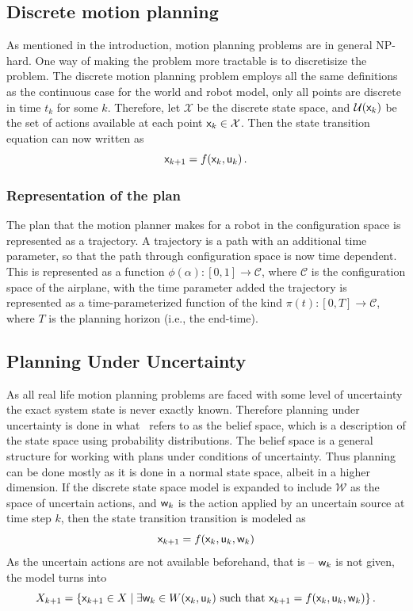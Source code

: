 \subsection{Discrete motion planning}

As mentioned in the introduction, motion planning problems are in general
NP-hard. One way of making the problem more tractable is to discretisize the
problem. The discrete motion planning problem employs all the same definitions
as the continuous case for the world and robot model, only all points are
discrete in time \(t_k\) for some \(k\). Therefore, let \(\mathcal{X}\) be the
discrete state space, and \(\mathcal{U}({\mathbf{\mathsf{x}}}_k)\) be the set of actions
available at each point \({\mathbf{\mathsf{x}}}_k \in \mathcal{X}\). Then the state
transition equation can now written as
\[
  {\mathbf{\mathsf{x}}}_{k+1} = f({\mathbf{\mathsf{x}}}_k, {\mathbf{\mathsf{u}}}_k) \, .
\]

\subsubsection{Representation of the plan}

The plan that the motion planner makes for a robot in the configuration space is
represented as a trajectory. A trajectory is a path with an additional time
parameter, so that the path through configuration space is now time dependent.
This is represented as a function \(\phi(\alpha) \colon [0,1] \rightarrow
\mathcal{C}\), where \(\mathcal{C}\) is the configuration space of the airplane,
with the time parameter added the trajectory is represented as a
time-parameterized function of the kind \(\pi(t) \colon [0,T] \rightarrow
\mathcal{C}\), where \(T\) is the planning horizon (i.e., the end-time).

\subsection{Planning Under Uncertainty}

As all real life motion planning problems are faced with some level of
uncertainty the exact system state is never exactly known. Therefore planning
under uncertainty is done in what~\citeauthor{Lav06} refers to as the belief
space, which is a description of the state space using probability
distributions. The belief space is a general structure for working with plans
under conditions of uncertainty. Thus planning can be done mostly as it is done
in a normal state space, albeit in a higher dimension. If the discrete state
space model is expanded to include \(\mathcal{W}\) as the space of uncertain
actions, and \({\mathbf{\mathsf{w}}}_k\) is the action applied by an uncertain source at time
step \(k\), then the state transition transition is modeled as~\cite{Lav06}
\[
  {\mathbf{\mathsf{x}}}_{k+1} = f({\mathbf{\mathsf{x}}}_k,{\mathbf{\mathsf{u}}}_k,{\mathbf{\mathsf{w}}}_k)
\]
As the uncertain actions are not available beforehand, that is -- \({\mathbf{\mathsf{w}}}_
k\) is not given, the model turns into
\[
  X_{k+1} = \lbrace {\mathbf{\mathsf{x}}}_{k+1} \in X \mid \exists {\mathbf{\mathsf{w}}}_k \in
    W({\mathbf{\mathsf{x}}}_k,{\mathbf{\mathsf{u}}}_k) \text{ such that } {\mathbf{\mathsf{x}}}_{k+1} =
    f({\mathbf{\mathsf{x}}}_k,{\mathbf{\mathsf{u}}}_k,{\mathbf{\mathsf{w}}}_k)\rbrace \, .
\] 

